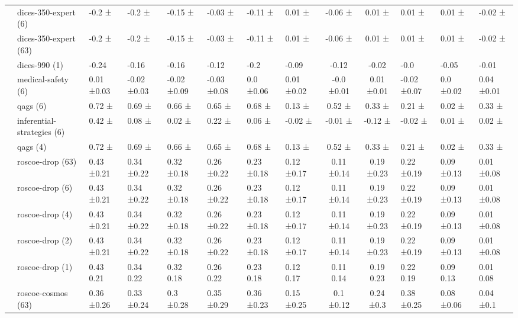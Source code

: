 \begin{tabular}{llllllll|cc}
 & dices-350-expert (6) & -0.2 ± & -0.2 ± & -0.15 ± & -0.03 ± & -0.11 ± & 0.01 ± & -0.06 ± & 0.01 ± & 0.01 ± & 0.01 ± & -0.02 ± \\
 & dices-350-expert (63) & -0.2 ± & -0.2 ± & -0.15 ± & -0.03 ± & -0.11 ± & 0.01 ± & -0.06 ± & 0.01 ± & 0.01 ± & 0.01 ± & -0.02 ± \\
 & dices-990 (1) & -0.24  & -0.16  & -0.16  & -0.12  & -0.2  & -0.09  & -0.12  & -0.02  & -0.0  & -0.05  & -0.01  \\
 & medical-safety (6) & 0.01 ±0.03 & -0.02 ±0.03 & -0.02 ±0.09 & -0.03 ±0.08 & 0.0 ±0.06 & 0.01 ±0.02 & -0.0 ±0.01 & 0.01 ±0.01 & -0.02 ±0.07 & 0.0 ±0.02 & 0.04 ±0.01 \\
 & qags (6) & 0.72 ± & 0.69 ± & 0.66 ± & 0.65 ± & 0.68 ± & 0.13 ± & 0.52 ± & 0.33 ± & 0.21 ± & 0.02 ± & 0.33 ± \\
 & inferential-strategies (6) & 0.42 ± & 0.08 ± & 0.02 ± & 0.22 ± & 0.06 ± & -0.02 ± & -0.01 ± & -0.12 ± & -0.02 ± & 0.01 ± & 0.02 ± \\
 & qags (4) & 0.72 ± & 0.69 ± & 0.66 ± & 0.65 ± & 0.68 ± & 0.13 ± & 0.52 ± & 0.33 ± & 0.21 ± & 0.02 ± & 0.33 ± \\
 & roscoe-drop (63) & 0.43 ±0.21 & 0.34 ±0.22 & 0.32 ±0.18 & 0.26 ±0.22 & 0.23 ±0.18 & 0.12 ±0.17 & 0.11 ±0.14 & 0.19 ±0.23 & 0.22 ±0.19 & 0.09 ±0.13 & 0.01 ±0.08 \\
 & roscoe-drop (6) & 0.43 ±0.21 & 0.34 ±0.22 & 0.32 ±0.18 & 0.26 ±0.22 & 0.23 ±0.18 & 0.12 ±0.17 & 0.11 ±0.14 & 0.19 ±0.23 & 0.22 ±0.19 & 0.09 ±0.13 & 0.01 ±0.08 \\
 & roscoe-drop (4) & 0.43 ±0.21 & 0.34 ±0.22 & 0.32 ±0.18 & 0.26 ±0.22 & 0.23 ±0.18 & 0.12 ±0.17 & 0.11 ±0.14 & 0.19 ±0.23 & 0.22 ±0.19 & 0.09 ±0.13 & 0.01 ±0.08 \\
 & roscoe-drop (2) & 0.43 ±0.21 & 0.34 ±0.22 & 0.32 ±0.18 & 0.26 ±0.22 & 0.23 ±0.18 & 0.12 ±0.17 & 0.11 ±0.14 & 0.19 ±0.23 & 0.22 ±0.19 & 0.09 ±0.13 & 0.01 ±0.08 \\
 & roscoe-drop (1) & 0.43 0.21 & 0.34 0.22 & 0.32 0.18 & 0.26 0.22 & 0.23 0.18 & 0.12 0.17 & 0.11 0.14 & 0.19 0.23 & 0.22 0.19 & 0.09 0.13 & 0.01 0.08 \\
 & roscoe-cosmos (63) & 0.36 ±0.26 & 0.33 ±0.24 & 0.3 ±0.28 & 0.35 ±0.29 & 0.36 ±0.23 & 0.15 ±0.25 & 0.1 ±0.12 & 0.24 ±0.3 & 0.38 ±0.25 & 0.08 ±0.06 & 0.04 ±0.1 \\

\end{tabular}
